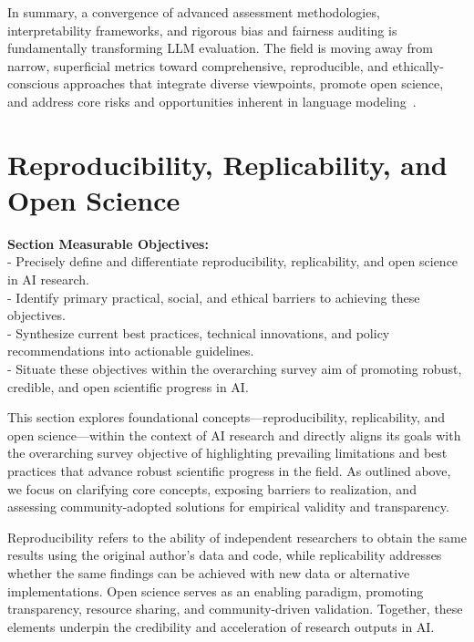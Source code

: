 \documentclass[sigconf]{acmart}
\begin{document}
In summary, a convergence of advanced assessment methodologies, interpretability frameworks, and rigorous bias and fairness auditing is fundamentally transforming LLM evaluation. The field is moving away from narrow, superficial metrics toward comprehensive, reproducible, and ethically-conscious approaches that integrate diverse viewpoints, promote open science, and address core risks and opportunities inherent in language modeling~\cite{ref1, ref3, ref10, ref14, ref19, ref35, ref36, ref43, ref45, ref46, ref49, ref52, ref65, ref73, ref76, ref81, ref83, ref84, ref85, ref91, ref94, ref95, ref101, ref104, ref106, ref108}.

\section{Reproducibility, Replicability, and Open Science}

\noindent
\textbf{Section Measurable Objectives:}\\
- Precisely define and differentiate reproducibility, replicability, and open science in AI research.\\
- Identify primary practical, social, and ethical barriers to achieving these objectives.\\
- Synthesize current best practices, technical innovations, and policy recommendations into actionable guidelines.\\
- Situate these objectives within the overarching survey aim of promoting robust, credible, and open scientific progress in AI.

This section explores foundational concepts—reproducibility, replicability, and open science—within the context of AI research and directly aligns its goals with the overarching survey objective of highlighting prevailing limitations and best practices that advance robust scientific progress in the field. As outlined above, we focus on clarifying core concepts, exposing barriers to realization, and assessing community-adopted solutions for empirical validity and transparency.

Reproducibility refers to the ability of independent researchers to obtain the same results using the original author's data and code, while replicability addresses whether the same findings can be achieved with new data or alternative implementations. Open science serves as an enabling paradigm, promoting transparency, resource sharing, and community-driven validation. Together, these elements underpin the credibility and acceleration of research outputs in AI.
\end{document}
